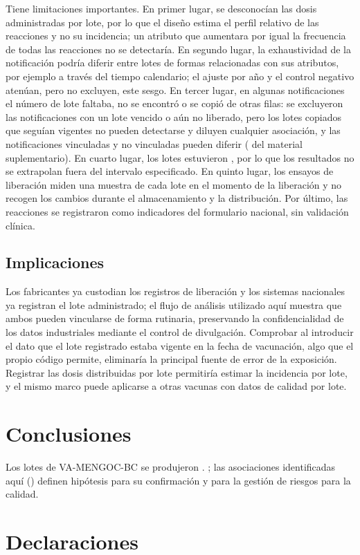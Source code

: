 \documentclass[11pt]{article}
\begin{document}
Tiene limitaciones importantes. En primer lugar, se desconocían las dosis administradas por lote,
por lo que el diseño estima el perfil relativo de las reacciones y no su incidencia; un atributo que
aumentara por igual la frecuencia de todas las reacciones no se detectaría. En segundo lugar, la
exhaustividad de la notificación podría diferir entre lotes de formas relacionadas con sus
atributos, por ejemplo a través del tiempo calendario; el ajuste por año y el control negativo
atenúan, pero no excluyen, este sesgo. En tercer lugar, en algunas notificaciones el número de lote
faltaba, no se encontró o se copió de otras filas: se excluyeron las notificaciones con un lote
vencido o aún no liberado, pero los lotes copiados que seguían vigentes no pueden detectarse y
diluyen cualquier asociación, y las notificaciones vinculadas y no vinculadas pueden diferir
( del material suplementario). En cuarto lugar, los lotes estuvieron
\PTWithinSpecPhrase, por lo que los resultados no se extrapolan fuera del intervalo especificado. En
quinto lugar, los ensayos de liberación miden una muestra de cada lote en el momento de la
liberación y no recogen los cambios durante el almacenamiento y la distribución. Por último, las
reacciones se registraron como indicadores del formulario nacional, sin validación clínica.

\subsection{Implicaciones}\label{sec:d-implications}
Los fabricantes ya custodian los registros de liberación y los sistemas nacionales ya registran el
lote administrado; el flujo de análisis utilizado aquí muestra que ambos pueden vincularse de forma
rutinaria, preservando la confidencialidad de los datos industriales mediante el control de
divulgación. Comprobar al introducir el dato que el lote registrado estaba vigente en la fecha de
vacunación, algo que el propio código permite, eliminaría la principal fuente de error de la
exposición. Registrar las dosis distribuidas por lote permitiría estimar la incidencia por lote, y
el mismo marco puede aplicarse a otras vacunas con datos de calidad por lote.

\section{Conclusiones}\label{sec:conclusions}
Los lotes de VA-MENGOC-BC se produjeron \PTWithinSpecPhrase. \PTConclusionSentence; las
asociaciones identificadas aquí (\PTSignificantList) definen hipótesis para su confirmación y para la
gestión de riesgos para la calidad.

\section*{Declaraciones}




\end{document}
